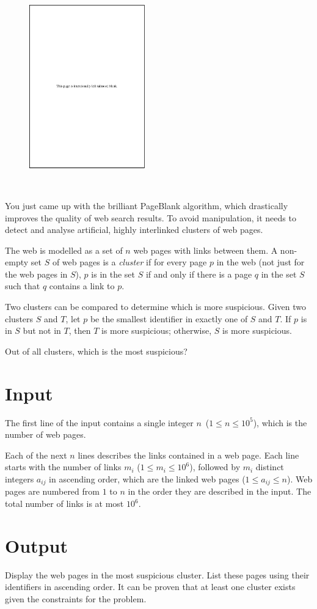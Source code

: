 
\begin{figure}
 \includegraphics[width=50mm]{img.pdf}
\end{figure}
~

You just came up with the brilliant PageBlank algorithm, which drastically improves the quality of web search results.
To avoid manipulation, it needs to detect and analyse artificial, highly interlinked clusters of web pages.

The web is modelled as a set of $n$ web pages with links between them. A non-empty set $S$ of web pages is a \textit{cluster} if for every page $p$ in the web (not just for the web pages in $S$), $p$ is in the set $S$ if and only if there is a page $q$ in the set $S$ such that $q$ contains a link to $p$.

Two clusters can be compared to determine which is more suspicious. Given two clusters $S$ and $T$, let $p$ be the smallest identifier in exactly one of $S$ and $T$.
If $p$ is in $S$ but not in $T$, then $T$ is more suspicious; otherwise, $S$ is more suspicious.

Out of all clusters, which is the most suspicious?



\section*{Input}

The first line of the input contains a single integer $n$~($1 \leq n \leq 10^5$), which is the number of web pages.

Each of the next $n$ lines describes the links contained in a web page.
Each line starts with the number of links $m_i$ ($1 \leq m_i \leq 10^6$), followed by $m_i$ distinct integers $a_{ij}$ in ascending order, which are the linked web pages ($1 \leq a_{ij} \leq n$).
Web pages are numbered from $1$ to $n$ in the order they are described in the input.
The total number of links is at most $10^6$.


\section*{Output}

Display the web pages in the most suspicious cluster. List these pages using their identifiers in ascending order. It can be proven that at least one cluster exists given the constraints for the problem.


